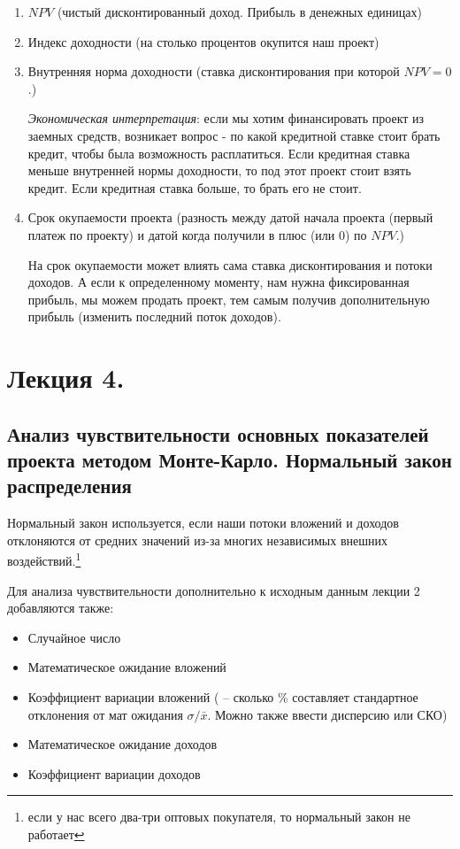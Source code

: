 \documentclass[reqno]{article}
\theoremstyle{definition}
\theoremstyle{definition}
\theoremstyle{definition}
\theoremstyle{definition}
\theoremstyle{definition}
\theoremstyle{definition}
\theoremstyle{definition}
\theoremstyle{definition}
\theoremstyle{definition}
\begin{document}
	\begin{enumerate}
		\item $NPV$ (чистый дисконтированный доход. Прибыль в денежных единицах)
		
		\item Индекс доходности (на столько процентов окупится наш проект)
		
		\item Внутренняя норма доходности (ставка дисконтирования при которой $NPV = 0$.)
		
		\setlength{\leftskip}{2em}
		\emph{Экономическая интерпретация}: если мы хотим финансировать проект из заемных средств, возникает вопрос - по какой кредитной ставке стоит брать кредит, чтобы была возможность расплатиться. Если кредитная ставка меньше внутренней нормы доходности, то под этот проект стоит взять кредит. Если кредитная ставка больше, то брать его не стоит.
		
		\setlength{\leftskip}{0em}
		\item Срок окупаемости проекта (разность между датой начала проекта (первый платеж по проекту) и датой когда получили в плюс (или 0) по $NPV$.)
		
		\setlength{\leftskip}{2em}
		На срок окупаемости может влиять сама ставка дисконтирования и потоки доходов. А  если к определенному моменту, нам нужна фиксированная прибыль, мы можем продать проект, тем самым получив дополнительную прибыль (изменить последний поток доходов).
	\end{enumerate}
	
	\newpage
	\section{Лекция 4.}
	\subsection{Анализ чувствительности основных показателей проекта методом Монте-Карло. Нормальный закон распределения}
	
	Нормальный закон используется, если наши потоки вложений и доходов отклоняются от средних значений из-за многих независимых внешних воздействий.\footnote{если у нас всего два-три оптовых покупателя, то нормальный закон не работает}
	
	Для анализа чувствительности дополнительно к исходным данным лекции 2 добавляются также:
	
	\begin{itemize}
		\item Случайное число
		
		\item Математическое ожидание вложений 
		
		\item Коэффициент вариации вложений ( -- сколько \% составляет стандартное отклонения от мат ожидания $\sigma / \bar{x}$. Можно также ввести дисперсию или СКО)
		
		\item Математическое ожидание доходов
		
		\item Коэффициент вариации доходов
	\end{itemize}
\end{document}
